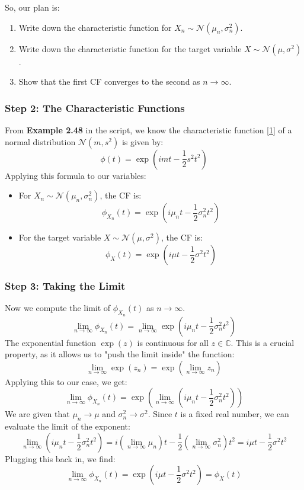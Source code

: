 \documentclass[11pt,a4paper]{article}
\begin{document}
So, our plan is:
\begin{enumerate}
    \item Write down the characteristic function for $X_n \sim \mathcal{N}(\mu_n, \sigma_n^2)$.
    \item Write down the characteristic function for the target variable $X \sim \mathcal{N}(\mu, \sigma^2)$.
    \item Show that the first CF converges to the second as $n \to \infty$.
\end{enumerate}

\subsubsection*{Step 2: The Characteristic Functions}
From \textbf{Example 2.48} in the script, we know the characteristic function \hyperlink{note1}{[1]} of a normal distribution $\mathcal{N}(m, s^2)$ is given by:
\[ \phi(t) = \exp\left(imt - \frac{1}{2}s^2t^2\right) \]
Applying this formula to our variables:
\begin{itemize}
    \item For $X_n \sim \mathcal{N}(\mu_n, \sigma_n^2)$, the CF is:
    \[ \phi_{X_n}(t) = \exp\left(i\mu_n t - \frac{1}{2}\sigma_n^2t^2\right) \]
    \item For the target variable $X \sim \mathcal{N}(\mu, \sigma^2)$, the CF is:
    \[ \phi_{X}(t) = \exp\left(i\mu t - \frac{1}{2}\sigma^2t^2\right) \]
\end{itemize}

\subsubsection*{Step 3: Taking the Limit}
Now we compute the limit of $\phi_{X_n}(t)$ as $n \to \infty$.
\[ \lim_{n \to \infty} \phi_{X_n}(t) = \lim_{n \to \infty} \exp\left(i\mu_n t - \frac{1}{2}\sigma_n^2t^2\right) \]
The exponential function $\exp(z)$ is continuous for all $z \in \mathbb{C}$. This is a crucial property, as it allows us to "push the limit inside" the function:
\[ \lim_{n \to \infty} \exp(z_n) = \exp\left(\lim_{n \to \infty} z_n\right) \]
Applying this to our case, we get:
\[ \lim_{n \to \infty} \phi_{X_n}(t) = \exp\left(\lim_{n \to \infty} \left(i\mu_n t - \frac{1}{2}\sigma_n^2t^2\right)\right) \]
We are given that $\mu_n \to \mu$ and $\sigma_n^2 \to \sigma^2$. Since $t$ is a fixed real number, we can evaluate the limit of the exponent:
\[ \lim_{n \to \infty} \left(i\mu_n t - \frac{1}{2}\sigma_n^2t^2\right) = i\left(\lim_{n \to \infty} \mu_n\right)t - \frac{1}{2}\left(\lim_{n \to \infty} \sigma_n^2\right)t^2 = i\mu t - \frac{1}{2}\sigma^2t^2 \]
Plugging this back in, we find:
\[ \lim_{n \to \infty} \phi_{X_n}(t) = \exp\left(i\mu t - \frac{1}{2}\sigma^2t^2\right) = \phi_X(t) \]
\end{document}

